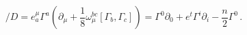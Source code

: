 \begin{equation}
\slash\!\!\!\!{D} = e_a^{\mu} \Gamma^a (\partial_{\mu} + \frac{1}{8} \omega_{\mu}^{b c} [\Gamma_b, \Gamma_c]) = \Gamma^0 \partial_0 + e^t \Gamma^i \partial_i -\frac{n}{2} \Gamma^0 \, .
\end{equation}

